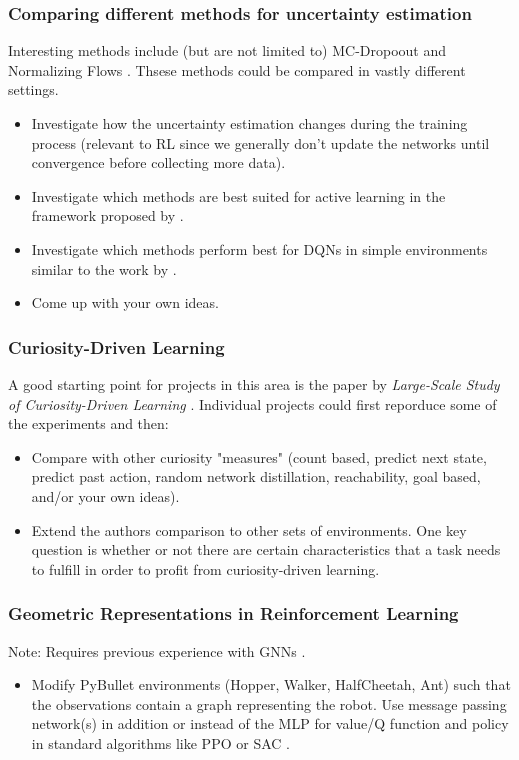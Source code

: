 \documentclass[a4paper]{article}
\begin{document}
\subsubsection{Comparing different methods for uncertainty estimation}
Interesting methods include (but are not limited to) MC-Dropoout \cite{Gal2016} and Normalizing Flows \cite{louizos2017multiplicative}. Thsese methods could be compared in vastly different settings.
\begin{itemize}
    \item Investigate how the uncertainty estimation changes during the training process (relevant to RL since we generally don’t update the networks until convergence before collecting more data).
    \item Investigate which methods are best suited for active learning in the framework proposed by \cite{gal2017active}.
    \item Investigate which methods perform best for DQNs in simple environments similar to the work by \cite{touati2018randomized}.
    \item Come up with your own ideas.
\end{itemize}

\subsubsection{Curiosity-Driven Learning}
A good starting point for projects in this area is the paper by \textit{Large-Scale Study of Curiosity-Driven Learning} \cite{burda2018largescale}. Individual projects could first reporduce some of the experiments and then:
\begin{itemize}
    \item Compare with other curiosity "measures" (count based, predict next state, predict past action, random network distillation, reachability, goal based, and/or your own ideas).
    \item Extend the authors comparison to other sets of environments. One key question is whether or not there are certain characteristics that a task needs to fulfill in order to profit from curiosity-driven learning.
\end{itemize}

\subsubsection{Geometric Representations in Reinforcement Learning}
Note: Requires previous experience with GNNs \cite{kipf2016semisupervised}.
\begin{itemize}
    \item Modify PyBullet environments (Hopper, Walker, HalfCheetah, Ant) such that the observations contain a graph representing the robot. Use message passing network(s) in addition or instead of the MLP for value/Q function and policy in standard algorithms like PPO \cite{Schulman2017} or SAC \cite{Haarnoja2018a}.
\end{itemize}




\end{document}
